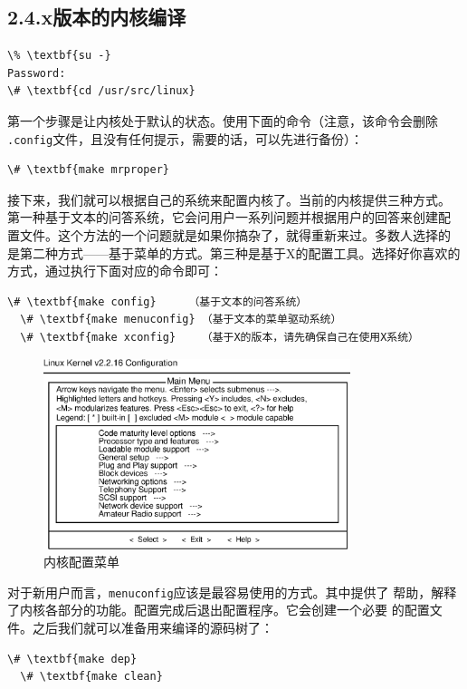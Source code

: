 \subsection{2.4.x版本的内核编译}
\label{sec:systemConfig:selectingAKernel:2_4_x}
\begin{Verbatim}[frame=single, commandchars=\\\{\}]
\% \textbf{su -}
Password:
\# \textbf{cd /usr/src/linux}
\end{Verbatim}

第一个步骤是让内核处于默认的状态。使用下面的命令（注意，该命令会删除
\texttt{.config}文件，且没有任何提示，需要的话，可以先进行备份）：
\begin{Verbatim}[frame=single, commandchars=\\\{\}]
\# \textbf{make mrproper}
\end{Verbatim}

接下来，我们就可以根据自己的系统来配置内核了。当前的内核提供三种方式。
第一种基于文本的问答系统，它会问用户一系列问题并根据用户的回答来创建配
置文件。这个方法的一个问题就是如果你搞杂了，就得重新来过。多数人选择的
是第二种方式——基于菜单的方式。第三种是基于X的配置工具。选择好你喜欢的
方式，通过执行下面对应的命令即可：
\begin{Verbatim}[frame=single, commandchars=\\\{\}]
  \# \textbf{make config}     （基于文本的问答系统）
  \# \textbf{make menuconfig} （基于文本的菜单驱动系统）
  \# \textbf{make xconfig}    （基于X的版本，请先确保自己在使用X系统）
\end{Verbatim}

\begin{figure}[htpb]
  \centering
  \includegraphics[width=0.8\textwidth]{images/selectingKernel/make-menuconfig.eps}
  \caption{内核配置菜单}
  \label{fig:make-menuconfig}
\end{figure}

对于新用户而言，\texttt{menuconfig}应该是最容易使用的方式。其中提供了
帮助，解释了内核各部分的功能。配置完成后退出配置程序。它会创建一个必要
的配置文件。之后我们就可以准备用来编译的源码树了：
\begin{Verbatim}[frame=single, commandchars=\\\{\}]
  \# \textbf{make dep}
  \# \textbf{make clean}
\end{Verbatim}

